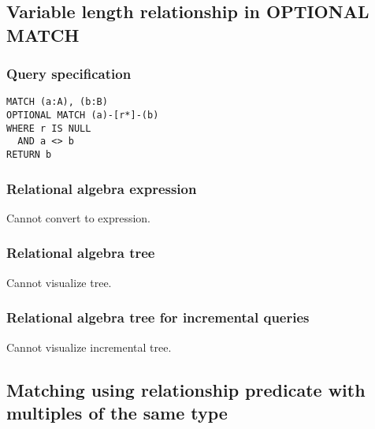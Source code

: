 
\subsection{Variable length relationship in OPTIONAL MATCH}

\subsubsection*{Query specification}

\begin{lstlisting}
MATCH (a:A), (b:B)
OPTIONAL MATCH (a)-[r*]-(b)
WHERE r IS NULL
  AND a <> b
RETURN b
\end{lstlisting}

\subsubsection*{Relational algebra expression}

Cannot convert to expression.

\subsubsection*{Relational algebra tree}

Cannot visualize tree.

\subsubsection*{Relational algebra tree for incremental queries}

Cannot visualize incremental tree.

\subsection{Matching using relationship predicate with multiples of the same type}

